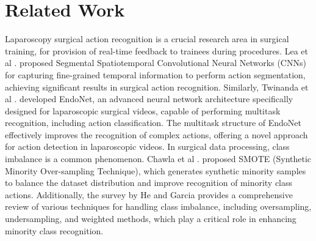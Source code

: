 \section{Related Work}
Laparoscopy surgical action recognition is a crucial research area in surgical training, for provision of real-time feedback to trainees during procedures. Lea et al \cite{lea2016segmental}. proposed Segmental Spatiotemporal Convolutional Neural Networks (CNNs) for capturing fine-grained temporal information to perform action segmentation, achieving significant results in surgical action recognition. Similarly, Twinanda et al \cite{twinanda2016endonet}. developed EndoNet, an advanced neural network architecture specifically designed for laparoscopic surgical videos, capable of performing multitask recognition, including action classification. The multitask structure of EndoNet effectively improves the recognition of complex actions, offering a novel approach for action detection in laparoscopic videos. In surgical data processing, class imbalance is a common phenomenon. Chawla et al \cite{chawla2002smote}. proposed SMOTE (Synthetic Minority Over-sampling Technique), which generates synthetic minority samples to balance the dataset distribution and improve recognition of minority class actions. Additionally, the survey by He and Garcia \cite{he2009learning} provides a comprehensive review of various techniques for handling class imbalance, including oversampling, undersampling, and weighted methods, which play a critical role in enhancing minority class recognition.

